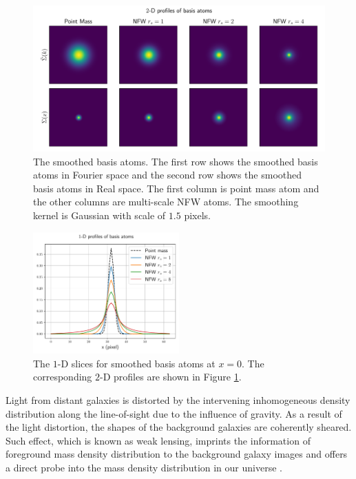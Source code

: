 \documentclass[twocolumn]{aastex62}
\begin{document}
\begin{figure}[!t]
    \includegraphics[width=1.\textwidth]{nfwlet-atom-2D.pdf}
    \caption{The smoothed basis atoms. The first row shows the smoothed basis atoms in Fourier space 
            and the second row shows the smoothed basis atoms in Real space. 
            The first column is point mass atom and the other columns are multi-scale NFW atoms.
            The smoothing kernel is Gaussian with scale of $1.5$ pixels.} \label{fig-atoms2D}
\end{figure}

\begin{figure}
 \includegraphics[width=0.5\textwidth]{nfwlet-atom-1D.pdf}
 \caption{The $1$-D slices for smoothed basis atoms at $x=0$. The corresponding $2$-D profiles are shown in Figure 
        \ref{fig-atoms2D}.} \label{fig-atoms1D}
\end{figure}

Light from distant galaxies is distorted by the intervening inhomogeneous density distribution along the line-of-sight
due to the influence of gravity. As a result of the light distortion, the shapes of the background galaxies are coherently
sheared. Such effect, which is known as weak lensing, imprints the information of foreground mass density distribution
to the background galaxy images and offers a direct probe into the mass density distribution in our universe
\citep[see][for recent reviews]{revKilbinger15,revRachel17}.
\end{document}
